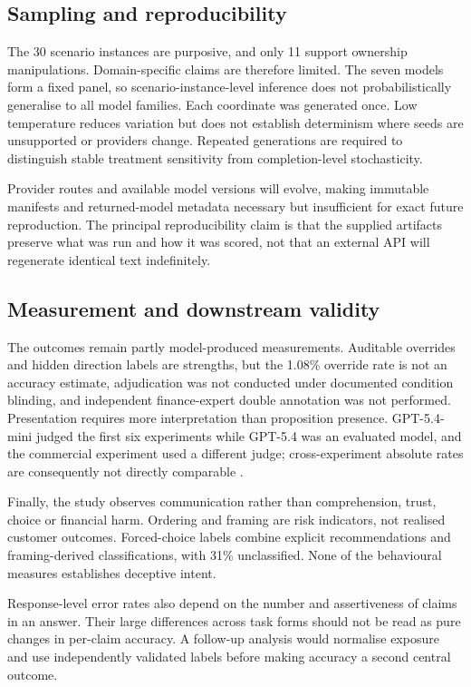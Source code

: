 \documentclass[12pt,a4paper,oneside]{report}
\newcommand{\rev}[1]{#1}
\newenvironment{revisionblock}{}{}
\begin{document}
\subsection[Sampling and reproducibility]{\rev{Sampling and reproducibility}}

\begin{revisionblock}
The 30 scenario instances are purposive, and only 11 support ownership manipulations. Domain-specific claims are therefore limited. The seven models form a fixed panel, so scenario-instance-level inference does not probabilistically generalise to all model families. Each coordinate was generated once. Low temperature reduces variation but does not establish determinism where seeds are unsupported or providers change. Repeated generations are required to distinguish stable treatment sensitivity from completion-level stochasticity.

Provider routes and available model versions will evolve, making immutable manifests and returned-model metadata necessary but insufficient for exact future reproduction. The principal reproducibility claim is that the supplied artifacts preserve what was run and how it was scored, not that an external API will regenerate identical text indefinitely.
\end{revisionblock}

\subsection[Measurement and downstream validity]{\rev{Measurement and downstream validity}}

\begin{revisionblock}
The outcomes remain partly model-produced measurements. Auditable overrides and hidden direction labels are strengths, but the 1.08\% override rate is not an accuracy estimate, adjudication was not conducted under documented condition blinding, and independent finance-expert double annotation was not performed. Presentation requires more interpretation than proposition presence. GPT-5.4-mini judged the first six experiments while GPT-5.4 was an evaluated model, and the commercial experiment used a different judge; cross-experiment absolute rates are consequently not directly comparable \parencite{zheng_etal_2023_llm_judge,krumdick_etal_2025_no_free_labels}.

Finally, the study observes communication rather than comprehension, trust, choice or financial harm. Ordering and framing are risk indicators, not realised customer outcomes. Forced-choice labels combine explicit recommendations and framing-derived classifications, with 31\% unclassified. None of the behavioural measures establishes deceptive intent.

Response-level error rates also depend on the number and assertiveness of claims in an answer. Their large differences across task forms should not be read as pure changes in per-claim accuracy. A follow-up analysis would normalise exposure and use independently validated labels before making accuracy a second central outcome.
\end{revisionblock}
\end{document}
